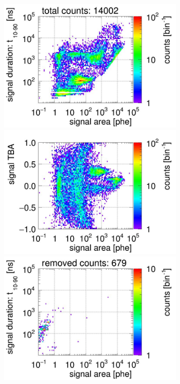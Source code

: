 \begin{landscape}
\begin{figure}[!p]
\begin{subfigure}[t]{0.32\textwidth}
		\centering
		\includegraphics[width=\figurewidth,clip,trim={0 98 0 15}]{Figures/GasTest/CutsValid/res64767/pdpa04Vecfig64767.jpg}
		\includegraphics[width=\figurewidth,clip,trim={0 98 0 40}]{Figures/GasTest/CutsValid/res64767/tbapa04Vecfig64767.jpg}
		\includegraphics[width=\figurewidth,clip,trim={0 98 0 15}]{Figures/GasTest/CutsValid/res64767/pdpaX04Vecfig64767.jpg}

\end{subfigure}
\end{figure}
\end{landscape}
